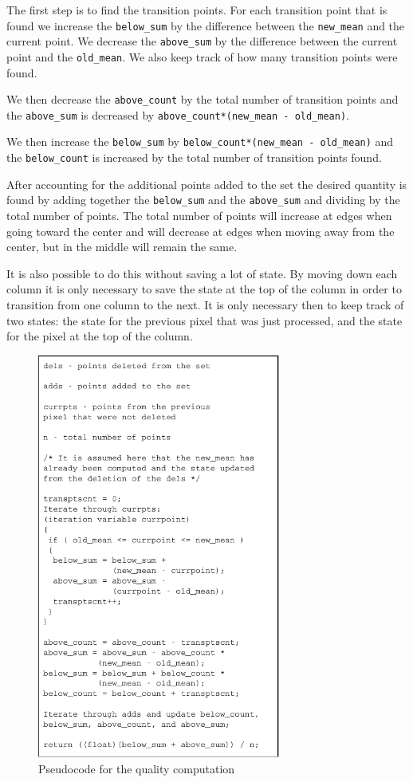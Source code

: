 \documentclass[twocolumn]{article}
\begin{document}
The first step is to find the transition points. For each transition
point that is found we increase the \texttt{below\_sum} by the
difference between the \texttt{new\_mean} and the current point. We
decrease the \texttt{above\_sum} by the difference between the current
point and the \texttt{old\_mean}. We also keep track of how many
transition points were found.

We then decrease the \texttt{above\_count} by the total number of
transition points and the \texttt{above\_sum} is decreased by
\texttt{above\_count*(new\_mean - old\_mean)}. 

We then increase the \texttt{below\_sum} by
\texttt{below\_count*(new\_mean - old\_mean)} and the
\texttt{below\_count} is increased by the total number of transition
points found.

After accounting for the additional points added to the set
the desired quantity is found by adding together the \texttt{below\_sum}
and the \texttt{above\_sum} and dividing by the total number of
points. The total number of points will increase at edges when
going toward the center and will decrease at edges when moving
away from the center, but in the middle will remain the same. 

It is also possible to do this without saving a lot of
state. By moving down each column it is only necessary to save
the state at the top of the column in order to transition from
one column to the next. It is only necessary then to keep
track of two states: the state for the previous pixel that was
just processed, and the state for the pixel at the top of the column.


\begin{figure}[!t]
\centering
\includegraphics[width=3.15in]{quality}
\caption{Pseudocode for the quality computation}
\label{fig:quality}
\end{figure}
\end{document}

